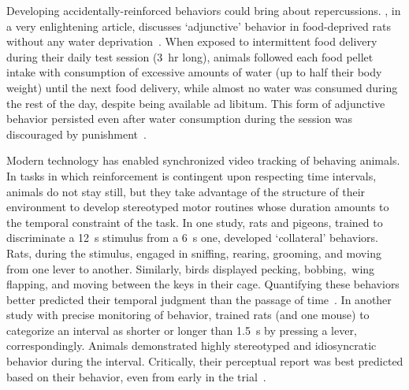 Developing accidentally-reinforced behaviors could bring about repercussions.
, in a very enlightening article, discusses `adjunctive' behavior in food-deprived rats without any water deprivation~\cite{Falk1971}.
When exposed to intermittent food delivery during their daily test session (3~hr long), animals followed each food pellet intake with consumption of excessive amounts of water (up to half their body weight) until the next food delivery, while almost no water was consumed during the rest of the day, despite being available ad libitum.
This form of adjunctive behavior persisted even after water consumption during the session was discouraged by punishment~\cite{Falk1971}.\footnotemark
{}
\par
Modern technology has enabled synchronized video tracking of behaving animals.
In tasks in which reinforcement is contingent upon respecting time intervals, animals do not stay still, but they take advantage of the structure of their environment to develop stereotyped motor routines whose duration amounts to the temporal constraint of the task.
In one study, rats and pigeons, trained to discriminate a 12~s stimulus from a 6~s one, developed `collateral' behaviors.
Rats, during the stimulus, engaged in sniffing, rearing, grooming, and moving from one lever to another.
Similarly, birds displayed pecking, bobbing,\footnotemark\ wing flapping, and moving between the keys in their cage.
Quantifying these behaviors better predicted their temporal judgment than the passage of time~\cite{Fetterman1998BehProc}.
In another study with precise monitoring of behavior, \citeauthor{Gouvea2014} trained rats (and one mouse) to categorize an interval as shorter or longer than 1.5~s by pressing a lever, correspondingly.
Animals demonstrated highly stereotyped and idiosyncratic behavior during the interval.
Critically, their perceptual report was best predicted based on their behavior, even from early in the trial~\cite{Gouvea2014}.
